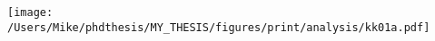 \documentclass{article}
\begin{document}
\texttt{[image: /Users/Mike/phdthesis/MY\_THESIS/figures/print/analysis/kk01a.pdf]}
\end{document}

